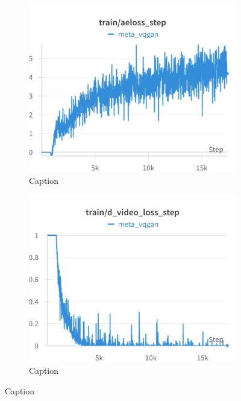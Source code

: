 \begin{figure}[H]
\begin{subfigure}[h]{.45\linewidth}
\end{subfigure}
\hfill
\begin{subfigure}[h]{.45\linewidth}
    \includegraphics[width=\linewidth]{detailed_engineering/Meta VQGAN/charts/train_aeloss_step.png}
    \caption{Caption}
    \label{fig:enter-label}
\end{subfigure}
\hfill
\begin{subfigure}[h]{.45\linewidth}
    \includegraphics[width=\linewidth]{detailed_engineering/Meta VQGAN/charts/train_d_video_loss_step.png}
    \caption{Caption}
    \label{fig:enter-label}
\end{subfigure}

\end{figure}
